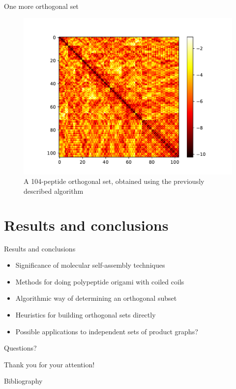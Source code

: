 \documentclass{beamer}
\theoremstyle{plain}
\theoremstyle{remark}
\begin{document}
\begin{frame}{One more orthogonal set}
\begin{figure}[h]
	\centering
	\includegraphics[width=0.8\linewidth]{interaction_matrix_hexaheptad.pdf}
	\caption{A 104-peptide orthogonal set, obtained using the previously described algorithm}
\end{figure}
\end{frame}

\section{Results and conclusions}

\begin{frame}{Results and conclusions}
	\begin{itemize}
		\item Significance of molecular self-assembly techniques
		\item Methods for doing polypeptide origami with coiled coils
		\item Algorithmic way of determining an orthogonal subset
		\item Heuristics for building orthogonal sets directly 
		\item Possible applications to independent sets of product graphs?
	\end{itemize}
\end{frame}

\begin{frame}[plain,c]
	\begin{center}
		\Huge Questions?
	\end{center}
\end{frame}

\begin{frame}[plain,c]
	\begin{center}
		\Huge Thank you for your attention!
	\end{center}
\end{frame}

\begin{frame}[allowframebreaks]{Bibliography}
	
	
\end{frame}
\end{document}
